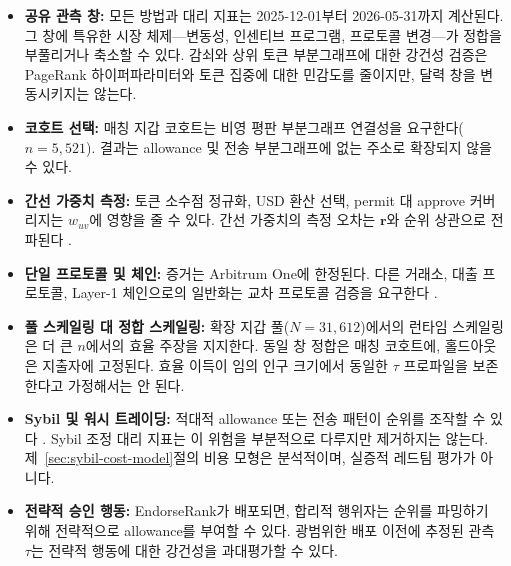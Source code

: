 
\begin{itemize}
\item \textbf{공유 관측 창:} 모든 방법과 대리 지표는 2025-12-01부터 2026-05-31까지 계산된다. 그 창에 특유한 시장 체제---변동성, 인센티브 프로그램, 프로토콜 변경---가 정합을 부풀리거나 축소할 수 있다. 감쇠와 상위 토큰 부분그래프에 대한 강건성 검증은 PageRank 하이퍼파라미터와 토큰 집중에 대한 민감도를 줄이지만, 달력 창을 변동시키지는 않는다.

\item \textbf{코호트 선택:} 매칭 지갑 코호트는 비영 평판 부분그래프 연결성을 요구한다($n=5{,}521$). 결과는 allowance 및 전송 부분그래프에 없는 주소로 확장되지 않을 수 있다.

\item \textbf{간선 가중치 측정:} 토큰 소수점 정규화, USD 환산 선택, permit 대 approve 커버리지는 $w_{uv}$에 영향을 줄 수 있다. 간선 가중치의 측정 오차는 $\mathbf{r}$와 순위 상관으로 전파된다 .
\end{itemize}


\begin{itemize}
\item \textbf{단일 프로토콜 및 체인:} 증거는 Arbitrum One에 한정된다. 다른 거래소, 대출 프로토콜, Layer-1 체인으로의 일반화는 교차 프로토콜 검증을 요구한다 .

\item \textbf{풀 스케일링 대 정합 스케일링:} 확장 지갑 풀($N=31{,}612$)에서의 런타임 스케일링은 더 큰 $n$에서의 효율 주장을 지지한다. 동일 창 정합은 매칭 코호트에, 홀드아웃은 지출자에 고정된다. 효율 이득이 임의 인구 크기에서 동일한 $\tau$ 프로파일을 보존한다고 가정해서는 안 된다.
\end{itemize}


\begin{itemize}
\item \textbf{Sybil 및 워시 트레이딩:} 적대적 allowance 또는 전송 패턴이 순위를 조작할 수 있다 . Sybil 조정 대리 지표는 이 위험을 부분적으로 다루지만 제거하지는 않는다. 제~\ref{sec:sybil-cost-model}절의 비용 모형은 분석적이며, 실증적 레드팀 평가가 아니다.

\item \textbf{전략적 승인 행동:} EndorseRank가 배포되면, 합리적 행위자는 순위를 파밍하기 위해 전략적으로 allowance를 부여할 수 있다. 광범위한 배포 이전에 추정된 관측 $\tau$는 전략적 행동에 대한 강건성을 과대평가할 수 있다.
\end{itemize}

